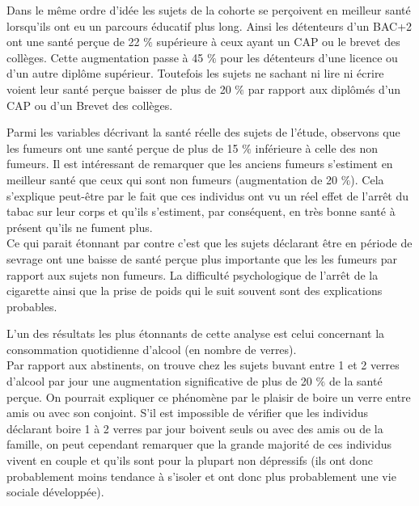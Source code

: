 \documentclass{book}
\begin{document}
\noindent
Dans le même ordre d'idée les sujets de la cohorte se perçoivent en meilleur santé lorsqu'ils ont eu un parcours éducatif plus long. Ainsi les détenteurs d'un BAC+2 ont une santé perçue de 22 $\%$ supérieure à ceux ayant un CAP ou le brevet des collèges. Cette augmentation passe à 45 $\%$ pour les détenteurs d'une licence ou d'un autre diplôme supérieur. Toutefois les sujets ne sachant ni lire ni écrire voient leur santé perçue baisser de plus de 20 $\%$ par rapport aux diplômés d'un CAP ou d'un Brevet des collèges.\\
\bigskip


\noindent
Parmi les variables décrivant la santé réelle des sujets de l'étude, observons que les fumeurs ont une santé perçue de plus de 15 $\%$ inférieure à celle des non fumeurs. Il est intéressant de remarquer que les anciens fumeurs s'estiment en meilleur santé que ceux qui sont non fumeurs (augmentation de 20 $\%$). Cela s'explique peut-être par le fait que ces individus ont vu un réel effet de l'arrêt du tabac sur leur corps et qu'ils s'estiment, par conséquent, en très bonne santé à présent qu'ils ne fument plus.\\
Ce qui parait étonnant par contre c'est que les sujets déclarant être en période de sevrage ont une baisse de santé perçue plus importante que les les fumeurs par rapport aux sujets non fumeurs. La difficulté psychologique de l'arrêt de la cigarette ainsi que la prise de poids qui le suit souvent sont des explications probables.\\
\bigskip

\noindent
L'un des résultats les plus étonnants de cette analyse est celui concernant la consommation quotidienne d'alcool (en nombre de verres).\\
Par rapport aux abstinents, on trouve chez les sujets buvant entre 1 et 2 verres d'alcool par jour une augmentation significative de plus de 20 $\%$ de la santé perçue. On pourrait expliquer ce phénomène par le plaisir de boire un verre entre amis ou avec son conjoint. S'il est impossible de vérifier que les individus déclarant boire 1 à 2 verres par jour boivent seuls ou avec des amis ou de la famille, on peut cependant remarquer que la grande majorité de ces individus vivent en couple et qu'ils sont pour la plupart non dépressifs (ils ont donc probablement moins tendance à s'isoler et ont donc plus probablement une vie sociale développée).
\end{document}
